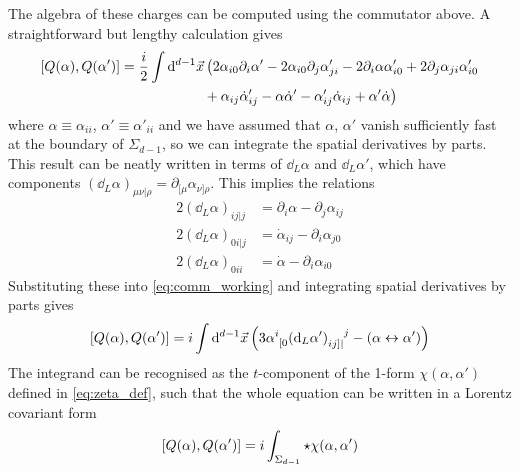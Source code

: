 The algebra of these charges can be computed using the commutator above. A straightforward but lengthy calculation gives 
\begin{equation}
\begin{split}\label{eq:comm_working}
    \comm{Q(\alpha)}{Q(\alpha')} &= \frac{i}{2} \int \dd[d-1]{\vec{x}} \big( 2 \alpha_{i0} \partial_i \alpha' - 2\alpha_{i0} \partial_j \alpha'_{ji} - 2\partial_i \alpha \alpha'_{i0} + 2\partial_j \alpha_{ji} \alpha'_{i0}\\
    & \qquad\qquad\qquad + \alpha_{ij} \dot{\alpha}'_{ij} - \alpha \dot{\alpha}' - \alpha'_{ij} \dot{\alpha}_{ij} + \alpha' \dot{\alpha} \big)
\end{split}
\end{equation}
where $\alpha \equiv \alpha_{ii}$, $\alpha' \equiv \alpha'_{ii}$ and we have assumed that $\alpha$, $\alpha'$ vanish sufficiently fast at the boundary of $\Sigma_{d-1}$, so we can integrate the spatial derivatives by parts.
This result can be neatly written in terms of $\dd_L \alpha$ and $\dd_L \alpha'$, which have components $(\dd_L \alpha)_{\mu\nu|\rho} = \partial_{[\mu} \alpha_{\nu]\rho}$. This implies the relations
\begin{equation}
\begin{split}
    2(\dd_L \alpha)_{ij|j} &= \partial_i \alpha - \partial_j \alpha_{ij} \\
    2(\dd_L \alpha)_{0i|j} &= \dot{\alpha}_{ij} - \partial_i \alpha_{j0} \\
    2(\dd_L \alpha)_{0ii} &= \dot{\alpha} - \partial_i \alpha_{i0}
\end{split}
\end{equation}
Substituting these into \eqref{eq:comm_working} and integrating spatial derivatives by parts gives
\begin{equation}
    \comm{Q(\alpha)}{Q(\alpha')} = i \int\dd[d-1]{\vec{x}} \left( 3 \alpha\indices{^i_{[0}} (\dd_L\alpha')\indices{_{ij]|}^j} - (\alpha\leftrightarrow\alpha') \right)
\end{equation}
The integrand can be recognised as the $t$-component of the 1-form $\chi(\alpha,\alpha')$ defined in \eqref{eq:zeta_def},
such that the whole equation can be written in a Lorentz covariant form
\begin{equation}
    \comm{Q(\alpha)}{Q(\alpha')} = i \int_{\Sigma_{d-1}} \star\chi(\alpha,\alpha')
\end{equation}


